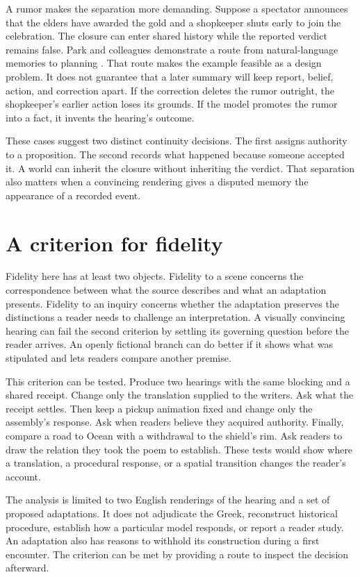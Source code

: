 \documentclass[11pt]{article}
\begin{document}
A rumor makes the separation more demanding. Suppose a spectator announces that the elders have awarded the gold and a shopkeeper shuts early to join the celebration. The closure can enter shared history while the reported verdict remains false. Park and colleagues demonstrate a route from natural-language memories to planning \cite{park2023generativeAgents}. That route makes the example feasible as a design problem. It does not guarantee that a later summary will keep report, belief, action, and correction apart. If the correction deletes the rumor outright, the shopkeeper's earlier action loses its grounds. If the model promotes the rumor into a fact, it invents the hearing's outcome.

These cases suggest two distinct continuity decisions. The first assigns authority to a proposition. The second records what happened because someone accepted it. A world can inherit the closure without inheriting the verdict. That separation also matters when a convincing rendering gives a disputed memory the appearance of a recorded event.

\section{A criterion for fidelity}
Fidelity here has at least two objects. Fidelity to a scene concerns the correspondence between what the source describes and what an adaptation presents. Fidelity to an inquiry concerns whether the adaptation preserves the distinctions a reader needs to challenge an interpretation. A visually convincing hearing can fail the second criterion by settling its governing question before the reader arrives. An openly fictional branch can do better if it shows what was stipulated and lets readers compare another premise.

This criterion can be tested. Produce two hearings with the same blocking and a shared receipt. Change only the translation supplied to the writers. Ask what the receipt settles. Then keep a pickup animation fixed and change only the assembly's response. Ask when readers believe they acquired authority. Finally, compare a road to Ocean with a withdrawal to the shield's rim. Ask readers to draw the relation they took the poem to establish. These tests would show where a translation, a procedural response, or a spatial transition changes the reader's account.

The analysis is limited to two English renderings of the hearing and a set of proposed adaptations. It does not adjudicate the Greek, reconstruct historical procedure, establish how a particular model responds, or report a reader study. An adaptation also has reasons to withhold its construction during a first encounter. The criterion can be met by providing a route to inspect the decision afterward.
\end{document}
